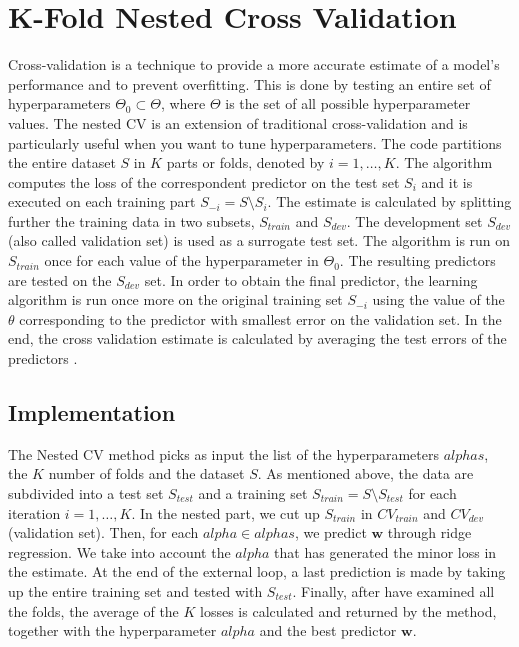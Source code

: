 \documentclass{article}
\begin{document}
\section{K-Fold Nested Cross Validation}
Cross-validation is a technique to provide a more accurate estimate of a model's performance and to prevent overfitting. This is done by testing an entire set of hyperparameters $\Theta_0 \subset \Theta$, where $\Theta$ is the set of all possible hyperparameter values. The nested CV is an extension of traditional cross-validation and is particularly useful when you want to tune hyperparameters.
The code partitions the entire dataset $S$ in $K$ parts or folds, denoted by $i = 1,\dots,K$. The algorithm computes the loss of the correspondent predictor on the test set $S_i$ and it is executed on each training part $S_{-i} = S \setminus S_{i}$. The estimate is calculated by splitting further the training data in two subsets, $S_{train}$ and $S_{dev}$. The development set $S_{dev}$ (also called validation set) is used as a surrogate test set. The algorithm is run on $S_{train}$ once for each value of the hyperparameter in $\Theta_0$. The resulting predictors are tested on the $S_{dev}$ set. In order to obtain the final predictor, the learning algorithm is run once more on the original training set $S_{-i}$ using the value of the $\theta$ corresponding to the predictor with smallest error on the validation set. In the end, the cross validation estimate is calculated by averaging the test errors of the predictors \cite{profcv}. \newline

\subsection{Implementation}
The Nested CV method picks as input the list of the hyperparameters $alphas$, the $K$ number of folds and the dataset $S$. As mentioned above, the data are subdivided into a test set $S_{test}$ and a training set $S_{train} = S \setminus S_{test}$ for each iteration $i = 1, \dots, K$. In the nested part, we cut up $S_{train}$ in $CV_{train}$ and $CV_{dev}$ (validation set). Then, for each $alpha \in alphas$, we predict $\boldsymbol{w}$ through ridge regression. We take into account the $alpha$ that has generated the minor loss in the estimate. At the end of the external loop, a last prediction is made by taking up the entire training set and tested with $S_{test}$.
Finally, after have examined all the folds, the average of the $K$ losses is calculated and returned by the method, together with the hyperparameter $alpha$ and the best predictor $\boldsymbol{w}$. 
\end{document}
